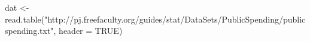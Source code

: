 \begin{Schunk}
\begin{Sinput}
 dat <- read.table("http://pj.freefaculty.org/guides/stat/DataSets/PublicSpending/publicspending.txt", header = TRUE)
\end{Sinput}
\end{Schunk}
